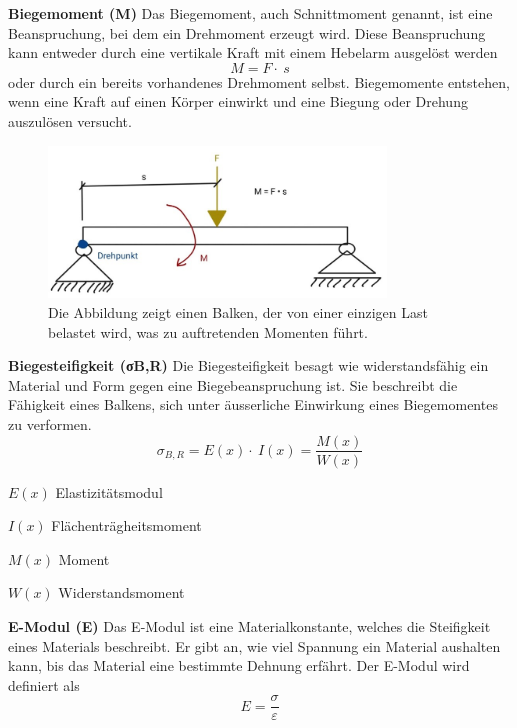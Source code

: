 \textbf{Biegemoment (M)}
Das Biegemoment, auch Schnittmoment genannt, ist eine Beanspruchung, bei dem ein Drehmoment erzeugt wird.
Diese Beanspruchung kann entweder durch eine vertikale Kraft mit einem Hebelarm ausgelöst werden
\begin{equation}
	M=
	F\cdot\ s
\end{equation}
oder durch ein bereits vorhandenes Drehmoment selbst.
Biegemomente entstehen, wenn eine Kraft auf einen Körper einwirkt und eine Biegung oder Drehung auszulösen versucht.
\begin{figure} [h]
	\centering
	\includegraphics[width=0.8\textwidth]{papers/balken/images/teil1/Biegemoment.jpg}
	\caption{Die Abbildung zeigt einen Balken, der von einer einzigen Last belastet wird, was zu auftretenden Momenten führt.}
	\label{fig:Die Abbildung zeigt einen Balken, der von einer einzigen Last belastet wird, was zu auftretenden Momenten führt.}
\end{figure}

\textbf{Biegesteifigkeit (σB,R)}
Die Biegesteifigkeit besagt wie widerstandsfähig ein Material und Form gegen eine Biegebeanspruchung ist.
Sie beschreibt die Fähigkeit eines Balkens, sich unter äusserliche Einwirkung eines Biegemomentes zu verformen.
\begin{equation}
\sigma_{B,R}=E
\left(x\right)\cdot\ I\left(x\right)=
\frac{M(x)}{W(x)}
\end{equation}

$E(x)$ Elastizitätsmodul

$I(x)$ Flächenträgheitsmoment

$M(x)$ Moment 

$W(x)$ Widerstandsmoment

\textbf{E-Modul (E)}
Das E-Modul ist eine Materialkonstante, welches die Steifigkeit eines Materials beschreibt.
Er gibt an, wie viel Spannung ein Material aushalten kann, bis das Material eine bestimmte Dehnung erfährt.
Der E-Modul wird definiert als
\begin{equation}
E=
\frac{\sigma}{\varepsilon}
\end{equation}

